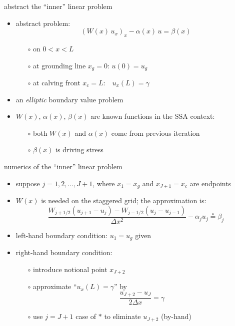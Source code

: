 \begin{frame}{abstract the ``inner'' linear problem}
\begin{itemize}
\item abstract problem:
   $$\left(W(x)\, u_x\right)_x - \alpha(x)\, u = \beta(x)$$

\vspace{-2mm}
  \begin{itemize}
  \item[$\circ$] on $0 < x < L$
  \item[$\circ$] at grounding line $x_g=0$: \quad $u(0) = u_g$
  \item[$\circ$] at calving front $x_c=L$: \quad\,\, $u_x(L) = \gamma$
  \end{itemize}
\item an \emph{elliptic} boundary value problem
\item $W(x)$, $\alpha(x)$, $\beta(x)$ are known functions in the SSA context:
  \begin{itemize}
  \item[$\circ$] both $W(x)$ and $\alpha(x)$ come from previous iteration
  \item[$\circ$] $\beta(x)$ is driving stress
  \end{itemize}
\end{itemize}
\end{frame}


\begin{frame}{numerics of the ``inner'' linear problem}

\begin{itemize}
\item suppose $j=1,2,\dots,J+1$, where $x_1 = x_g$ and $x_{J+1} = x_c$ are endpoints
\item $W(x)$ is needed on the staggered grid; the approximation is:
$$\frac{W_{j+1/2} (u_{j+1} - u_j) - W_{j-1/2} (u_{j} - u_{j-1})}{\Delta x^2} - \alpha_j u_j \stackrel{\ast}{=} \beta_j$$
\item left-hand boundary condition: $u_1 = u_g$ given
\item right-hand boundary condition:
  \begin{itemize}
  \item[$\circ$] introduce notional point $x_{J+2}$
  \item[$\circ$] approximate ``$u_x(L)=\gamma$'' by
    $$\frac{u_{J+2} - u_J}{2 \Delta x} = \gamma$$
  \item[$\circ$] use $j=J+1$ case of $\ast$ to eliminate $u_{J+2}$ (by-hand)
  \end{itemize}
\end{itemize}
\end{frame}


